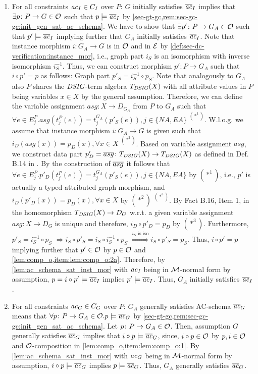 \begin{enumerate}
  \item For all constraints $\mathit{ac}_I \in C_I$ over $P$: $G$ initially satisfies $\overline{\mathit{ac}}_I$ implies that $\exists p\colon P \to G \in {\cal O}$ such that $p \models \overline{\mathit{ac}}_I$ by \cref{sec-gt-gc,rem:sec-gc-gc:init_gen_sat_ac_schema}.
  We have to show that $\exists p'\colon P \to G_A \in {\cal O}$ such that $p' \models \overline{\mathit{ac}}_I$ implying further that $G_A$ initially satisfies $\overline{\mathit{ac}}_I$.
  Note that instance morphism $i\colon G_A \to G$ is in ${\cal O}$ and in $\mathcal{E}$ by \cref{def:sec-dc-verification:instance_mor}, i.e., graph part $i_S$ is an isomorphism with inverse isomorphism $i^{-1}_S$.
  Thus, we can construct morphism $p'\colon P \to G_A$ such that $i \circ p'=p$ as follows:
  Graph part $p'_S=i^{-1}_S \circ p_S$.
  Note that analogously to $G_A$ also $P$ shares the $\mathit{DSIG}$-term algebra $T_\mathit{DSIG}(X)$ with all attribute values in $P$ being variables $x \in X$ by the general assumption.
  Therefore, we can define the variable assignment $asg\colon X \to D_{G_A}$ from $P$ to $G_A$ such that $\forall e \in E_j^P.asg(t_j^P(e))=t_j^{G_A}(p'_S(e)), j \in \{NA,EA\}$ $^{(*^1)}$.
  W.l.o.g. we assume that instance morphism $i\colon G_A \to G$ is given such that $i_D(asg(x))=p_D(x), \forall x \in X$ $^{(*^2)}$.
  Based on variable assignment $asg$, we construct data part $p'_D=\overline{asg}\colon T_\mathit{DSIG}(X) \to T_\mathit{DSIG}(X)$ as defined in Def. B.14 in \cite{Ehrig:2006:FAG:1121741}.
  By the construction of $\overline{asg}$ it follows that $\forall e \in E_j^P.p'_D(t_j^P(e))=t_j^{G_A}(p'_S(e)),j \in \{NA,EA\}$ by $(*^1)$, i.e., $p'$ is actually a typed attributed graph morphism, and $i_D(p'_D(x))=p_D(x), \forall x \in X$ by $(*^2)$ $^{(*^3)}$.
  By Fact B.16, Item 1, in \cite{Ehrig:2006:FAG:1121741} the homomorphism $T_\mathit{DSIG}(X) \to D_G$ w.r.t. a given variable assignment $asg\colon X \to D_G$ is unique and therefore, $i_D \circ p'_D=p_D$ by $(*^3)$.
  Furthermore, $p'_S=i_S^{-1} \circ p_S$ $\Rightarrow i_S \circ p'_S=i_S \circ i_S^{-1} \circ p_S$ $\stackrel{i_S\text{ is iso}}{\Rightarrow} i_S \circ p'_S=p_S$.
  Thus, $i \circ p'=p$ implying further that $p' \in {\cal O}$ by $p \in {\cal O}$ and \cref{lem:comp_o,item:lem:comp_o:2a}.
  Therefore, by \cref{lem:ac_schema_sat_inst_mor} with $\mathit{ac}_I$ being in ${\cal M}$-normal form by assumption, $p=i \circ p' \models \overline{\mathit{ac}}_I$ implies $p' \models \overline{\mathit{ac}}_I$.
  Thus, $G_A$ initially satisfies $\overline{\mathit{ac}}_I$.
  \item For all constraints $\mathit{ac}_G \in C_G$ over $P$: $G_A$ generally satisfies AC-schema $\overline{\mathit{ac}}_G$ means that $\forall p\colon P \to G_A \in {\cal O}.p \models \overline{\mathit{ac}}_G$ by \cref{sec-gt-gc,rem:sec-gc-gc:init_gen_sat_ac_schema}.
  Let $p\colon P \to G_A \in {\cal O}$.
  Then, assumption $G$ generally satisfies $\overline{\mathit{ac}}_G$ implies that $i \circ p \models \overline{\mathit{ac}}_G$, since, $i \circ p \in {\cal O}$ by $p,i \in {\cal O}$ and ${\cal O}$-composition in \cref{lem:comp_o,item:lem:comp_o:1}.
  By \cref{lem:ac_schema_sat_inst_mor} with $\mathit{ac}_G$ being in ${\cal M}$-normal form by assumption, $i \circ p \models \overline{\mathit{ac}}_G$ implies $p \models \overline{\mathit{ac}}_G$.
  Thus, $G_A$ generally satisfies $\overline{\mathit{ac}}_G$.
\end{enumerate}
